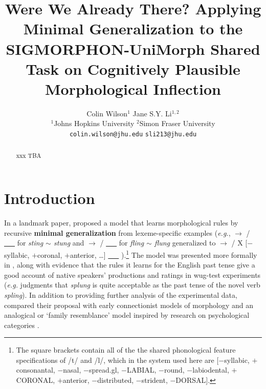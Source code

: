 \documentclass[11pt]{article}
\title{Were We Already There? Applying Minimal Generalization to the SIGMORPHON-UniMorph Shared Task on Cognitively Plausible Morphological Inflection}
\author{
  Colin Wilson$^1$ \qquad\qquad\qquad Jane S.Y. Li$^{1,2}$ \\
  $^1$Johns Hopkins University \qquad $^2$Simon Fraser University \\
  \texttt{colin.wilson@jhu.edu} \quad \texttt{sli213@jhu.edu}}
\begin{document}
\maketitle
\begin{abstract}
xxx TBA
\end{abstract}

\section{Introduction}

In a landmark paper, \citet{albright2003} proposed a model that learns morphological rules by recursive \textbf{minimal generalization} from lexeme-specific examples (\emph{e.g.},  $\to$  /  \underline{\ \ \ }  for \emph{sting $\sim$ stung} and  $\to$  /  \underline{\ \ \ }  for \emph{fling $\sim$ flung} generalized to   $\to$  / X [$-$syllabic, $+$coronal, $+$anterior, \ldots] \underline{\ \ \ } ).\footnote{The square brackets contain all of the the shared phonological feature specifications of /t/ and /l/, which in the system used here are $[$$-$syllabic, $+$consonantal, $-$nasal, $-$spread.gl, $-$LABIAL, $-$round, $-$labiodental, $+$CORONAL, $+$anterior, $-$distributed, $-$strident, $-$DORSAL$]$.} The model was presented more formally in \citet{albright-hayes-2002-modeling}, along with evidence that the rules it learns for the English past tense give a good account of native speakers' productions and ratings in wug-test experiments (\emph{e.g.} judgments that \textit{splung} is quite acceptable as the past tense of the novel verb \textit{spling}). In addition to providing further analysis of the experimental data, \citet{albright2003} compared their proposal with early connectionist models of morphology \citep[\emph{e.g.,}][]{plunkett1999} and an analogical or `family resemblance' model inspired by research on psychological categories \citep{nakisa2001}.
\end{document}
